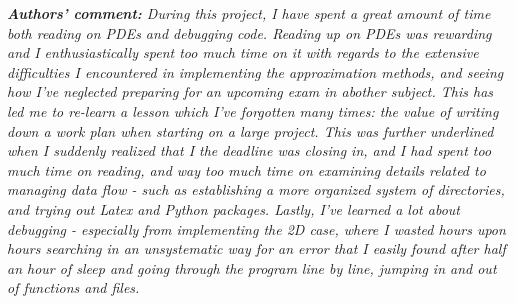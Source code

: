 \documentclass[%
oneside,                 %
final,                   %
10pt]{article}
\begin{document}
\newpage
\textit{\textbf{Authors' comment:} During this project, I have spent a great amount of time both reading on PDEs and debugging code. Reading up on PDEs was rewarding and I enthusiastically spent too much time on it with regards to the extensive difficulties I encountered in implementing the approximation methods, and seeing how I've neglected preparing for an upcoming exam in abother subject. This has led me to re-learn a lesson which I've forgotten many times: the value of writing down a work plan when starting on a large project. This was further underlined when I suddenly realized that I the deadline was closing in, and I had spent too much time on reading, and way too much time on examining details related to managing data flow - such as establishing a more organized system of directories, and trying out Latex and Python packages. Lastly, I've learned a lot about debugging - especially from implementing the 2D case, where I wasted hours upon hours searching in an unsystematic way for an error that I easily found after half an hour of sleep and going through the program line by line, jumping in and out of functions and files. }
\end{document}
